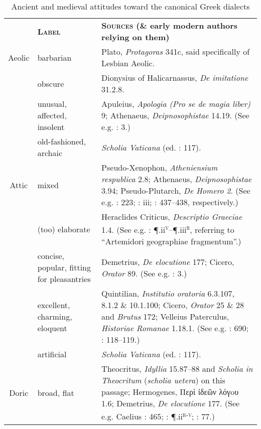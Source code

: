 \begin{table}
\caption{Ancient and medieval attitudes toward the canonical Greek dialects}\label{tab:7.1}
 
\begin{tabularx}{\textwidth}{XXX}
\lsptoprule

\multicolumn{1}{c}{\textbf{\textsc{Dialect}}} & \textbf{\textsc{Label}} & \textbf{\textsc{Sources} \textbf{(\&} \textbf{early} \textbf{modern} \textbf{authors} \textbf{relying} \textbf{on} \textbf{them)}}\\
\multicolumn{1}{c}{Aeolic} & barbarian & Plato, \textit{Protagoras} 341c, said specifically of Lesbian Aeolic.\\
& obscure & Dionysius of Halicarnassus, \textit{De imitatione} 31.2.8.\\
 & unusual, affected, insolent & Apuleius, \textit{Apologia (Pro se de magia liber)} 9; Athenaeus, \textit{Deipnosophistae} 14.19. (See e.g. \citealt{Munthe1748}: 3.)\\
 & old-fashioned, archaic & \textit{Scholia Vaticana} (ed. \citealt{Hilgard1901}: 117).\\
\multicolumn{1}{c}{Attic} & mixed & Pseudo-Xenophon, \textit{Atheniensium respublica} 2.8; Athenaeus, \textit{Deipnosophistae} 3.94; Pseudo-Plutarch, \textit{De Homero 2}. (See e.g. \citealt{Schwartz1721}: 223; \citealt{Maittaire1706}: iii; \citealt{Saumaise1643a}: 437–438, respectively.)\\
& (too) elaborate & Heraclides Criticus, \textit{Descriptio Graeciae} 1.4. (See e.g. \citealt{Estienne1573}: ¶.ii\textsc{\textsuperscript{v}}–¶.iii\textsc{\textsuperscript{r}}, referring to “Artemidori geographiae fragmentum”.)\\
 & concise, popular, fitting for pleasantries & Demetrius, \textit{De elocutione} 177; Cicero, \textit{Orator} 89. (See e.g. \citealt{Munthe1748}: 3.)\\
 & excellent, charming, eloquent & Quintilian, \textit{Institutio oratoria} 6.3.107, 8.1.2 \& 10.1.100; Cicero, \textit{Orator} 25 \& 28 and \textit{Brutus} 172; Velleius Paterculus, \textit{Historiae Romanae} 1.18.1. (See e.g. \citealt{Duret1613}: 690; \citealt{Rollin1726}: 118–119.)\\
 & artificial & \textit{Scholia Vaticana} (ed. \citealt{Hilgard1901}: 117).\\
\multicolumn{1}{c}{Doric} & broad, flat & Theocritus, \textit{Idyllia} 15.87–88 and \textit{Scholia in Theocritum} (\textit{scholia uetera}) on this passage; Hermogenes, Περὶ ἰδεῶν λόγoυ 1.6; Demetrius, \textit{De elocutione} 177. (See e.g. Caelius \citealt{Rhodiginus1542}: 465; \citealt{Estienne1573}: ¶.ii\textsc{\textsuperscript{r-v}}; \citealt{Saumaise1643a}: 77.)\\

\end{tabularx}
\end{table}
